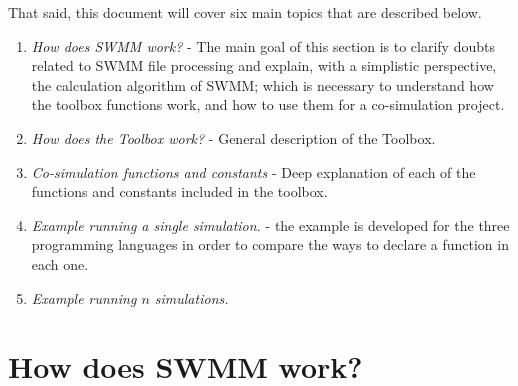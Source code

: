 \documentclass[11pt, letterpaper]{article}
\begin{document}
That said, this document will cover six main topics that are described below. 
\begin{enumerate}
\item \emph{How does SWMM work?} - The main goal of this section is to clarify doubts related to SWMM file processing and explain, with a simplistic perspective, the calculation algorithm of SWMM; which is necessary to understand how the toolbox functions work, and how to use them for a co-simulation project.
\item \emph{How does the Toolbox work?} - General description of the Toolbox.
\item \emph{Co-simulation functions and constants} - Deep explanation of each of the functions and constants included in the toolbox.
\item \emph{Example running a single simulation.} - the example is developed for the three programming languages in order to compare the ways to declare a function in each one.
\item \emph{Example running $n$ simulations.}
\end{enumerate}
\pagebreak

\section{How does SWMM work?}
\setlength\parindent{0pt}
\end{document}
